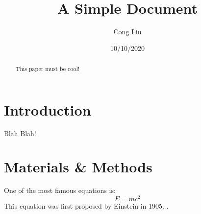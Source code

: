 \documentclass[12pt]{article}
\title{A Simple Document}
\author{Cong Liu}
\date{10/10/2020}
\begin{document}
    \maketitle

    \begin{abstract}
        This paper must be cool!
    \end{abstract}

    \section{Introduction}
        Blah Blah!

    \section{Materials \& Methods}
        One of the most famous equations is:
    \begin{equation}
        E = mc^2
    \end{equation}
        This equation was first proposed by Einstein in 1905.
    \cite{einstein1905does}.
    
    
    
\end{document}
